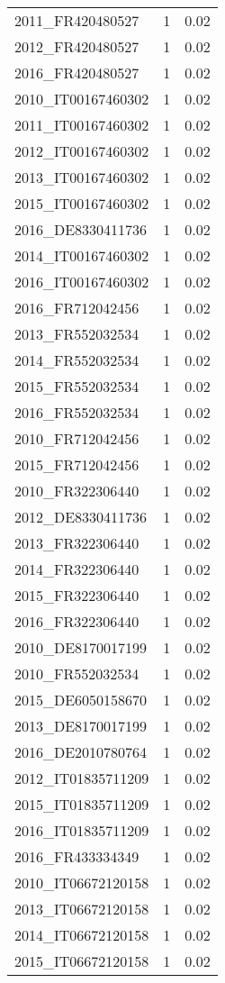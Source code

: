 \begin{table*}[htbp]
\begin{tabular}{lrr}
2011_FR420480527 & 1 & 0.02 \\
2012_FR420480527 & 1 & 0.02 \\
2016_FR420480527 & 1 & 0.02 \\
2010_IT00167460302 & 1 & 0.02 \\
2011_IT00167460302 & 1 & 0.02 \\
2012_IT00167460302 & 1 & 0.02 \\
2013_IT00167460302 & 1 & 0.02 \\
2015_IT00167460302 & 1 & 0.02 \\
2016_DE8330411736 & 1 & 0.02 \\
2014_IT00167460302 & 1 & 0.02 \\
2016_IT00167460302 & 1 & 0.02 \\
2016_FR712042456 & 1 & 0.02 \\
2013_FR552032534 & 1 & 0.02 \\
2014_FR552032534 & 1 & 0.02 \\
2015_FR552032534 & 1 & 0.02 \\
2016_FR552032534 & 1 & 0.02 \\
2010_FR712042456 & 1 & 0.02 \\
2015_FR712042456 & 1 & 0.02 \\
2010_FR322306440 & 1 & 0.02 \\
2012_DE8330411736 & 1 & 0.02 \\
2013_FR322306440 & 1 & 0.02 \\
2014_FR322306440 & 1 & 0.02 \\
2015_FR322306440 & 1 & 0.02 \\
2016_FR322306440 & 1 & 0.02 \\
2010_DE8170017199 & 1 & 0.02 \\
2010_FR552032534 & 1 & 0.02 \\
2015_DE6050158670 & 1 & 0.02 \\
2013_DE8170017199 & 1 & 0.02 \\
2016_DE2010780764 & 1 & 0.02 \\
2012_IT01835711209 & 1 & 0.02 \\
2015_IT01835711209 & 1 & 0.02 \\
2016_IT01835711209 & 1 & 0.02 \\
2016_FR433334349 & 1 & 0.02 \\
2010_IT06672120158 & 1 & 0.02 \\
2013_IT06672120158 & 1 & 0.02 \\
2014_IT06672120158 & 1 & 0.02 \\
2015_IT06672120158 & 1 & 0.02 \\

\end{tabular}
\end{table*}
